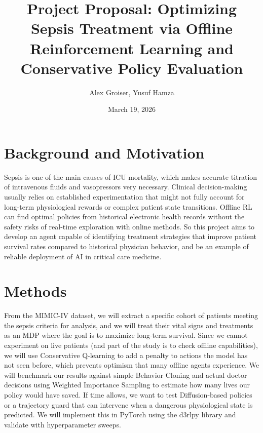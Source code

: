 \documentclass[11pt]{article}
\title{\vspace{-1cm}Project Proposal: Optimizing Sepsis Treatment via Offline Reinforcement Learning and Conservative Policy Evaluation}
\author{Alex Groiser, Yusuf Hamza}
\date{March 19, 2026}
\begin{document}
\maketitle
\vspace{-0.5cm}

\section*{Background and Motivation}
Sepsis is one of the main causes of ICU mortality, which makes accurate titration of intravenous fluids and vasopressors very necessary. Clinical decision-making usually relies on established experimentation that might not fully account for long-term physiological rewards or complex patient state transitions. Offline RL can find optimal policies from historical electronic health records without the safety risks of real-time exploration with online methods. So this project aims to develop an agent capable of identifying treatment strategies that improve patient survival rates compared to historical physician behavior, and be an example of reliable deployment of AI in critical care medicine.

\section*{Methods}
From the MIMIC-IV dataset, we will extract a specific cohort of patients meeting the sepsis criteria for analysis, and we will treat their vital signs and treatments as an MDP where the goal is to maximize long-term survival. Since we cannot experiment on live patients (and part of the study is to check offline capabilities), we will use Conservative Q-learning to add a penalty to actions the model has not seen before, which prevents optimism that many offline agents experience. We will benchmark our results against simple Behavior Cloning and actual doctor decisions using Weighted Importance Sampling to estimate how many lives our policy would have saved. If time allows, we want to test Diffusion-based policies or a trajectory guard that can intervene when a dangerous physiological state is predicted. We will implement this in PyTorch using the d3rlpy library and validate with hyperparameter sweeps.
\end{document}
